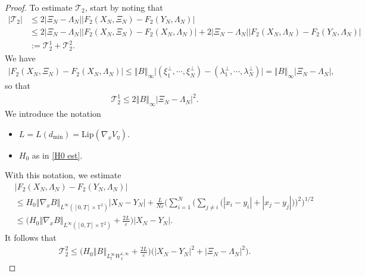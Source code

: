 \documentclass[11pt,reqno]{amsart}
\numberwithin{equation}{section}
\begin{document}
\begin{proof}
To estimate $\mathcal{T}_{2}$,  start by noting that 
\begin{align*}
|\mathcal{T}_{2}|&\leq 2\left\vert \Xi_{N}-\Lambda_{N}\right\vert \left\vert F_{2}(X_{N},\Xi_{N})-F_{2}(Y_{N},\Lambda_{N})\right\vert\\
&\leq 2\left\vert \Xi_{N}-\Lambda_{N}\right\vert \left\vert F_{2}(X_{N},\Xi_{N})-F_{2}(X_{N},\Lambda_{N})\right\vert+2\left\vert \Xi_{N}-\Lambda_{N}\right\vert \left\vert F_{2}(X_{N},\Lambda_{N})-F_{2}(Y_{N},\Lambda_{N})\right\vert\\
&:=\mathcal{T}_{2}^{1}+\mathcal{T}_{2}^{2}. 
\end{align*}
We have 
\begin{align*}
\left\vert F_{2}(X_{N},\Xi_{N})-F_{2}(X_{N},\Lambda_{N})\right\vert
\leq \left\Vert B\right\Vert_{\infty}\big\vert (\xi_{1}^{\perp},\cdots\!,\xi_{N}^{\perp})-(\lambda_{1}^{\perp},\cdots\!,\lambda_{N}^{\perp})\big\vert
=\left\Vert B\right\Vert_{\infty}\left\vert \Xi_{N}-\Lambda_{N}\right\vert,          
\end{align*}
so that
\begin{align}
\mathcal{T}_{2}^{1}\leq  2\left\Vert B\right\Vert_{\infty} \left\vert \Xi_{N}-\Lambda_{N}\right\vert^{2}.\label{est on T12}     
\end{align}
We introduce the notation 
\begin{itemize}
  \item[{\rm(a)}]$L=L(d_{\min})=\mathrm{Lip}(\nabla_{x}V_{\eta})$.
   \item[{\rm(b)}] $H_{0}$ as in \eqref{H0 est}. 
\end{itemize}
With this notation, we estimate 
\begin{align*}
&\left\vert F_{2}(X_{N},\Lambda_{N})-F_{2}(Y_{N},\Lambda_{N})\right\vert\\
&\leq H_{0}\left\Vert \nabla_xB\right\Vert_{L^{\infty}([0,T]\times\mathbb T^2)}\left\vert X_{N}-Y_{N}\right\vert
+\frac{L}{N\varepsilon}
\bigg(\sum_{i=1}^{N}\Big(\sum_{j\ne i}
\bigl(|x_i-y_i|+|x_j-y_j|\bigr)\Big)^2\bigg)^{1/2}\\
&\leq \big(H_{0}\left\Vert \nabla_xB\right\Vert_{L^{\infty}([0,T]\times\mathbb T^2)}+\frac{2L}{\varepsilon}\big)\left\vert X_{N}-Y_{N}\right\vert.
\end{align*}
It follows that 
\begin{align}
\mathcal{T}^{2}_{2}\leq \big(H_{0}\left\Vert B\right\Vert_{L^{\infty}_{t}W^{1,\infty}_{x}} +\frac{2L}{\varepsilon}\big)\big(\left\vert X_{N}-Y_{N}\right\vert^{2}+\left\vert \Xi_{N}-\Lambda_{N}\right\vert^{2}\big). \label{est on T22} 

\end{align}
\end{proof}
\end{document}
